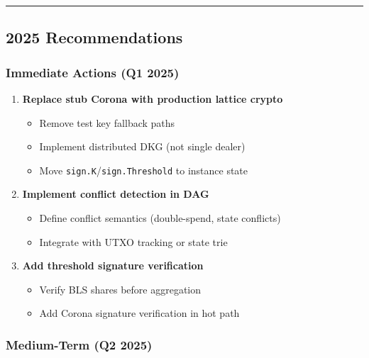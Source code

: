 \documentclass[
]{article}
\providecommand{\tightlist}{%
  \setlength{\itemsep}{0pt}\setlength{\parskip}{0pt}}
\begin{document}
\begin{center}\rule{0.5\linewidth}{0.5pt}\end{center}

\subsection{2025 Recommendations}\label{2025-recommendations}

\subsubsection{Immediate Actions (Q1
2025)}\label{immediate-actions-q1-2025}

\begin{enumerate}
\def\labelenumi{\arabic{enumi}.}
\item
  \textbf{Replace stub Corona with production lattice crypto}

  \begin{itemize}
  \tightlist
  \item
    Remove test key fallback paths
  \item
    Implement distributed DKG (not single dealer)
  \item
    Move \texttt{sign.K}/\texttt{sign.Threshold} to instance state
  \end{itemize}
\item
  \textbf{Implement conflict detection in DAG}

  \begin{itemize}
  \tightlist
  \item
    Define conflict semantics (double-spend, state conflicts)
  \item
    Integrate with UTXO tracking or state trie
  \end{itemize}
\item
  \textbf{Add threshold signature verification}

  \begin{itemize}
  \tightlist
  \item
    Verify BLS shares before aggregation
  \item
    Add Corona signature verification in hot path
  \end{itemize}
\end{enumerate}

\subsubsection{Medium-Term (Q2 2025)}\label{medium-term-q2-2025}
\end{document}
